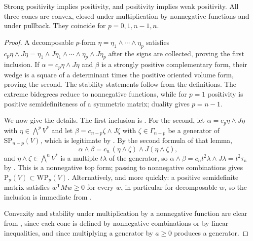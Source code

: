 \begin{proposition}
\label{prop:ch09-positivity-inclusions}
Strong positivity implies positivity, and positivity implies weak positivity.
All three cones are convex, closed under multiplication by nonnegative
functions and under pullback. They coincide for $p=0,1,n-1,n$.
\end{proposition}
\begin{proof}
A decomposable $p$-form
$\eta=\eta_1\wedge\cdots\wedge\eta_p$ satisfies
$c_p\eta\wedge J\eta=
\eta_1\wedge J\eta_1\wedge\cdots\wedge\eta_p\wedge J\eta_p$ after the
signs are collected, proving the first inclusion. If $\alpha=c_p\eta\wedge
J\eta$ and $\beta$ is a strongly positive complementary form, their wedge is
a square of a determinant times the positive oriented volume form, proving
the second. The stability statements follow from the definitions. The extreme
bidegrees reduce to nonnegative functions, while for $p=1$ positivity is
positive semidefiniteness of a symmetric matrix; duality gives $p=n-1$.

We now give the details.  The first inclusion is
.  For the second, let $\alpha=c_p\eta\wedge J\eta$
with $\eta\in\bigwedge^pV^*$ and let
$\beta=c_{n-p}\zeta\wedge J\zeta$ with $\zeta\in\Gamma_{n-p}$ be a generator
of $\mathrm{SP}_{n-p}(V)$, which is legitimate by
.  By the second formula of that lemma,
\[
 \alpha\wedge\beta
 =c_n\,(\eta\wedge\zeta)\wedge J(\eta\wedge\zeta),
\]
and $\eta\wedge\zeta\in\bigwedge^nV^*$ is a multiple $t\lambda$ of the
generator, so
$\alpha\wedge\beta=c_nt^2\lambda\wedge J\lambda=t^2\tau_n$ by
.  This is a nonnegative top form; passing to
nonnegative combinations gives $\mathrm{P}_p(V)\subset\mathrm{WP}_p(V)$.
Alternatively, and more quickly: a positive semidefinite matrix satisfies
$w^{\mathsf T}Mw\geq0$ for every $w$, in particular for decomposable $w$, so
the inclusion is immediate from
.

Convexity and stability under multiplication by a nonnegative function are
clear from , since each cone is defined by nonnegative
combinations or by linear inequalities, and since multiplying a generator by
$a\geq0$ produces a generator.


\end{proof}
